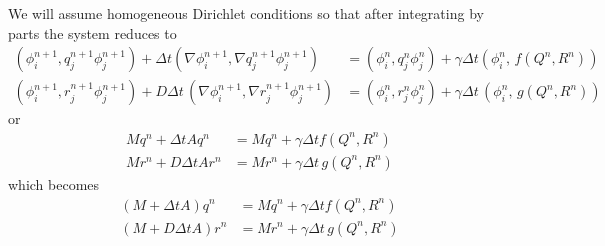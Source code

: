 \documentclass{article}
\begin{document}
We will assume homogeneous Dirichlet conditions so that after integrating by
parts the system reduces to
\begin{align}
    (\phi_i^{n+1}, q_j^{n+1}\phi_j^{n+1}) + \Delta t (\nabla \phi_i^{n+1}, \nabla q_j^{n+1} \phi_j^{n+1})
    &= (\phi_i^{n}, q_j^{n}\phi_j^{n}) + \gamma \Delta t (\phi_i^{n},\, f(Q^{n}, R^{n}))\\
    (\phi_i^{n+1}, r_j^{n+1} \phi_j^{n+1}) + D\Delta t\, (\nabla \phi_i^{n+1},\nabla r_j^{n+1}\phi_j^{n+1})
    &= (\phi_i^n, r_j^{n}\phi_j^{n}) + \gamma \Delta t\, (\phi_i^{n},\, g(Q^{n}, R^{n}))
\end{align}
or
\begin{align}
    Mq^n + \Delta t Aq^n
    &= Mq^{n} + \gamma \Delta t f(Q^{n}, R^{n})\\
    Mr^n + D\Delta t Ar^n
    &= Mr^{n} + \gamma \Delta t\, g(Q^{n}, R^{n})
\end{align}
which becomes
\begin{align}
    (M + \Delta t A)q^n
    &= Mq^{n} + \gamma \Delta t f(Q^{n}, R^{n})\\
    (M + D\Delta t A)r^n
    &= Mr^{n} + \gamma \Delta t\, g(Q^{n}, R^{n})
\end{align}
\end{document}
